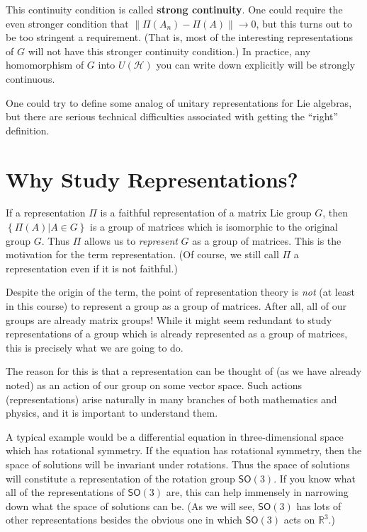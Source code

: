 \documentclass[12pt]{amsbook}
\theoremstyle{plain}
\numberwithin{equation}{chapter}
\numberwithin{theorem}{chapter}
\begin{document}
This continuity condition is called \textbf{strong continuity}. One could
require the even stronger condition that $\left\|  \Pi(A_{n})-\Pi(A)\right\|
\rightarrow0$, but this turns out to be too stringent a requirement. (That is,
most of the interesting representations of $G$ will not have this stronger
continuity condition.) In practice, any homomorphism of $G$ into
$U(\mathcal{H})$ you can write down explicitly will be strongly continuous.

One could try to define some analog of unitary representations for Lie
algebras, but there are serious technical difficulties associated with getting
the ``right'' definition.

\section{Why Study Representations?}

If a representation $\Pi$ is a faithful representation of a matrix Lie group
$G$, then $\left\{  \Pi(A)\left|  A\in G\right.  \right\}  $ is a group of
matrices which is isomorphic to the original group $G$. Thus $\Pi$ allows us
to \textit{represent} $G$ as a group of matrices. This is the motivation for
the term representation. (Of course, we still call $\Pi$ a representation even
if it is not faithful.)

Despite the origin of the term, the point of representation theory is
\textit{not} (at least in this course) to represent a group as a group of
matrices. After all, all of our groups are already matrix groups! While it
might seem redundant to study representations of a group which is already
represented as a group of matrices, this is precisely what we are going to do.

The reason for this is that a representation can be thought of (as we have
already noted) as an action of our group on some vector space. Such actions
(representations) arise naturally in many branches of both mathematics and
physics, and it is important to understand them.

A typical example would be a differential equation in three-dimensional space
which has rotational symmetry. If the equation has rotational symmetry, then
the space of solutions will be invariant under rotations. Thus the space of
solutions will constitute a representation of the rotation group
$\mathsf{SO}(3)$. If you know what all of the representations of
$\mathsf{SO}(3)$ are, this can help immensely in narrowing down what the space
of solutions can be. (As we will see, $\mathsf{SO}(3)$ has lots of other
representations besides the obvious one in which $\mathsf{SO}(3)$ acts on
$\mathbb{R}^{3}$.)
\end{document}
